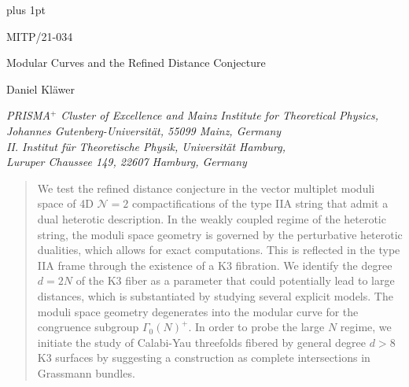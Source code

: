 \documentclass[11pt,a4paper]{article}
\numberwithin{equation}{section}
\numberwithin{table}{section}\setlength{\multlinegap}{25pt}
\begin{document}
\baselineskip=14pt
\parskip 5pt plus 1pt 


\vspace*{-1.5cm}
\begin{flushright}    %
  {\small MITP/21-034
  }
\end{flushright}

\vspace{2cm}
\begin{center}        %
  {\LARGE Modular Curves and the Refined Distance Conjecture}
\end{center}

\vspace{0.5cm}
\begin{center}        %
{\large  Daniel Kl\"awer}
\end{center}

\vspace{0.15cm}
\begin{center}        %
\emph{PRISMA$^{+}$ Cluster of Excellence and Mainz Institute for Theoretical Physics, \\
Johannes Gutenberg-Universit\"at, 55099 Mainz, Germany\\[0.5cm]
II. Institut für Theoretische Physik, Universität Hamburg,\\
Luruper Chaussee 149, 22607 Hamburg, Germany}
\\[0.15cm]
 
\end{center}

\vspace{2cm}


\begin{abstract}
\noindent   
    We test the refined distance conjecture in the vector multiplet moduli space of 4D $\mathcal{N}=2$ compactifications of the type IIA string that admit a dual heterotic description. In the weakly coupled regime of the heterotic string, the moduli space geometry is governed by the perturbative heterotic dualities, which allows for exact computations. This is reflected in the type IIA frame through the existence of a K3 fibration. We identify the degree $d=2N$ of the K3 fiber as a parameter that could potentially lead to large distances, which is substantiated by studying several explicit models. The moduli space geometry degenerates into the modular curve for the congruence subgroup $\Gamma_0(N)^+$. In order to probe the large $N$ regime, we initiate the study of Calabi-Yau threefolds fibered by general degree $d>8$ K3 surfaces by suggesting a construction as complete intersections in Grassmann bundles.
\end{abstract}
\end{document}
